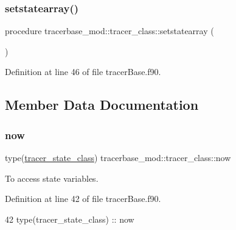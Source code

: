 \subsubsection{\texorpdfstring{setstatearray()}{setstatearray()}}
{\footnotesize\ttfamily procedure tracerbase\+\_\+mod\+::tracer\+\_\+class\+::setstatearray (\begin{DoxyParamCaption}{ }\end{DoxyParamCaption})\hspace{0.3cm}{\ttfamily [private]}}



Definition at line 46 of file tracer\+Base.\+f90.



\subsection{Member Data Documentation}
\mbox{\label{structtracerbase__mod_1_1tracer__class_ad1a1e2f727ad281e2562952d6ba94526}} 
\subsubsection{\texorpdfstring{now}{now}}
{\footnotesize\ttfamily type(\mbox{\hyperlink{structtracerbase__mod_1_1tracer__state__class}{tracer\+\_\+state\+\_\+class}}) tracerbase\+\_\+mod\+::tracer\+\_\+class\+::now\hspace{0.3cm}{\ttfamily [private]}}



To access state variables. 



Definition at line 42 of file tracer\+Base.\+f90.


\begin{DoxyCode}
42         \textcolor{keywordtype}{type}(tracer\_state\_class) :: now
\end{DoxyCode}
\mbox{\label{structtracerbase__mod_1_1tracer__class_aca04297200aad39fd04e31b630d9ca50}} 
